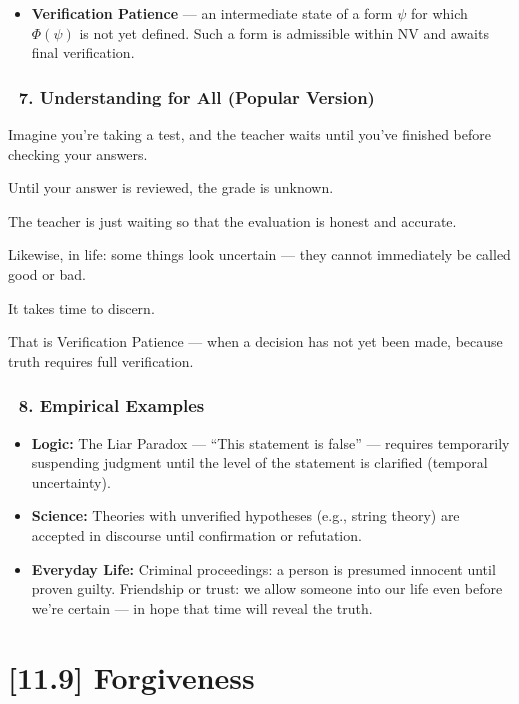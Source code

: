 \documentclass[12pt]{article}
\begin{document}
\begin{itemize}
\item \textbf{Verification Patience} — an intermediate state of a form $\psi$ for which $\Phi(\psi)$ is not yet defined. Such a form is admissible within \text{[4.3]} NV and awaits final verification.
\end{itemize}

\subsubsection*{🔹 7. Understanding for All (Popular Version)}

Imagine you're taking a test, and the teacher waits until you've finished before checking your answers.

Until your answer is reviewed, the grade is unknown.

The teacher is just waiting so that the evaluation is honest and accurate.

Likewise, in life: some things look uncertain — they cannot immediately be called good or bad.

It takes time to discern.

That is Verification Patience — when a decision has not yet been made, because truth requires full verification.

\subsubsection*{🔹 8. Empirical Examples}

\begin{itemize}
\item \textbf{Logic:} The Liar Paradox — ``This statement is false'' — requires temporarily suspending judgment until the level of the statement is clarified (temporal uncertainty).
\item \textbf{Science:} Theories with unverified hypotheses (e.g., string theory) are accepted in discourse until confirmation or refutation.
\item \textbf{Everyday Life:} Criminal proceedings: a person is presumed innocent until proven guilty. Friendship or trust: we allow someone into our life even before we're certain — in hope that time will reveal the truth.
\end{itemize}


\section*{[11.9] Forgiveness}
\end{document}
